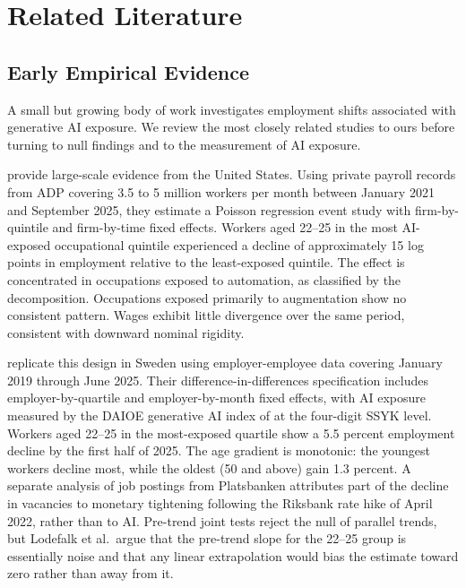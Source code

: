\section{Related Literature}\label{sec:literature}

\subsection{Early Empirical Evidence}

A small but growing body of work investigates employment shifts associated with generative AI exposure. We review the most closely related studies to ours before turning to null findings and to the measurement of AI exposure.

\cite{brynjolfsson2025} provide large-scale evidence from the United States. Using private payroll records from ADP covering 3.5 to 5 million workers per month between January 2021 and September 2025, they estimate a Poisson regression event study with firm-by-quintile and firm-by-time fixed effects. Workers aged 22--25 in the most AI-exposed occupational quintile experienced a decline of approximately 15 log points in employment relative to the least-exposed quintile. The effect is concentrated in occupations exposed to automation, as classified by the \cite{handa2025} decomposition. Occupations exposed primarily to augmentation show no consistent pattern. Wages exhibit little divergence over the same period, consistent with downward nominal rigidity.

\cite{lodefalk2026} replicate this design in Sweden using employer-employee data covering January 2019 through June 2025. Their difference-in-differences specification includes employer-by-quartile and employer-by-month fixed effects, with AI exposure measured by the DAIOE generative AI index of \cite{engberg2024} at the four-digit SSYK level. Workers aged 22--25 in the most-exposed quartile show a 5.5 percent employment decline by the first half of 2025. The age gradient is monotonic: the youngest workers decline most, while the oldest (50 and above) gain 1.3 percent. A separate analysis of job postings from Platsbanken attributes part of the decline in vacancies to monetary tightening following the Riksbank rate hike of April 2022, rather than to AI. Pre-trend joint tests reject the null of parallel trends, but Lodefalk et al.\ argue that the pre-trend slope for the 22--25 group is essentially noise and that any linear extrapolation would bias the estimate toward zero rather than away from it.

